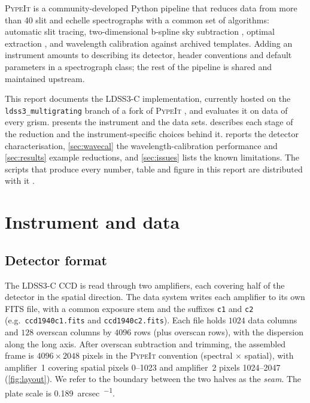 \documentclass[11pt,a4paper]{article}
\newcommand{\pypeit}{\textsc{PypeIt}}
\newcommand{\code}[1]{\texttt{#1}}
\begin{document}
\pypeit{} \citep{pypeit:joss_pub,pypeit:zenodo} is a community-developed Python
pipeline that reduces data from more than 40 slit and echelle spectrographs with
a common set of algorithms: automatic slit tracing, two-dimensional
b-spline sky subtraction \citep{Kelson2003}, optimal extraction
\citep{Horne1986}, and wavelength calibration against archived templates. Adding
an instrument amounts to describing its detector, header conventions and default
parameters in a spectrograph class; the rest of the pipeline is shared and
maintained upstream.

This report documents the LDSS3-C implementation, currently hosted on the
\code{ldss3\_multigrating} branch of a fork of \pypeit{} \citep{ldss3_fork}, and
evaluates it on data of every grism.  presents the instrument and
the data sets.  describes each stage of the reduction and
the instrument-specific choices behind it.  reports the
detector characterisation, \cref{sec:wavecal} the wavelength-calibration
performance and \cref{sec:results} example reductions, and \cref{sec:issues}
lists the known limitations. The scripts that produce every
number, table and figure in this report are distributed with it
\citep{ldss3_qa}.

\section{Instrument and data}
\label{sec:data}

\subsection{Detector format}

The LDSS3-C CCD is read through two amplifiers, each covering half of the
detector in the spatial direction. The data system writes each amplifier to its
own FITS file, with a common exposure stem and the suffixes \code{c1} and
\code{c2} (e.g.\ \code{ccd1940c1.fits} and \code{ccd1940c2.fits}). Each file
holds $1024$ data columns and $128$ overscan columns by $4096$ rows (plus
overscan rows), with the dispersion along the long axis. After overscan
subtraction and trimming, the assembled frame is $4096\times2048$ pixels in the
\pypeit{} convention (spectral $\times$ spatial), with amplifier~1 covering spatial
pixels 0--1023 and amplifier~2 pixels 1024--2047
(\cref{fig:layout}). We refer to the boundary between the two halves as the
\emph{seam}. The plate scale is \SI{0.189}{arcsec\per\pixel}.
\end{document}
